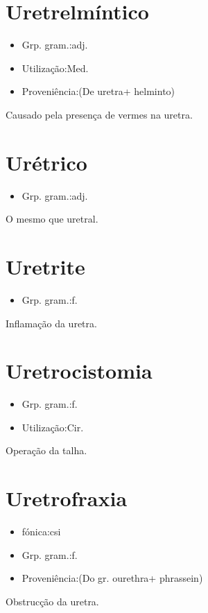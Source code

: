 \documentclass{article}
\begin{document}
\section{Uretrelmíntico}
\begin{itemize}
\item {Grp. gram.:adj.}
\end{itemize}
\begin{itemize}
\item {Utilização:Med.}
\end{itemize}
\begin{itemize}
\item {Proveniência:(De \textunderscore uretra\textunderscore  + \textunderscore helminto\textunderscore )}
\end{itemize}
Causado pela presença de vermes na uretra.
\section{Urétrico}
\begin{itemize}
\item {Grp. gram.:adj.}
\end{itemize}
O mesmo que \textunderscore uretral\textunderscore .
\section{Uretrite}
\begin{itemize}
\item {Grp. gram.:f.}
\end{itemize}
Inflamação da uretra.
\section{Uretrocistomia}
\begin{itemize}
\item {Grp. gram.:f.}
\end{itemize}
\begin{itemize}
\item {Utilização:Cir.}
\end{itemize}
Operação da talha.
\section{Uretrofraxia}
\begin{itemize}
\item {fónica:csi}
\end{itemize}
\begin{itemize}
\item {Grp. gram.:f.}
\end{itemize}
\begin{itemize}
\item {Proveniência:(Do gr. \textunderscore ourethra\textunderscore  + \textunderscore phrassein\textunderscore )}
\end{itemize}
Obstrucção da uretra.
\end{document}
